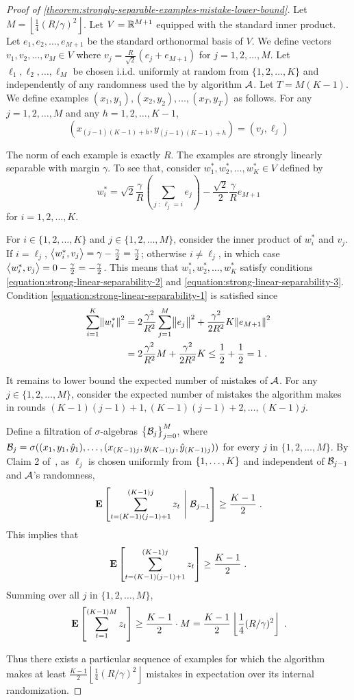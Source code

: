 \begin{proof}[Proof of \autoref{theorem:strongly-separable-examples-mistake-lower-bound}]
Let $M = \left\lfloor \frac{1}{4} (R/\gamma)^2
\right\rfloor$. Let $V = \mathbb{R}^{M+1}$ equipped with the standard inner product.
Let $e_1, e_2, \dots, e_{M+1}$ be the standard orthonormal basis of $V$. We
define vectors $v_1, v_2, \dots, v_M \in V$ where $v_j = \frac{R}{\sqrt{2}}(e_j
+ e_{M+1})$ for $j=1,2,\dots,M$. Let $\ell_1, \ell_2, \dots, \ell_M$ be chosen
i.i.d. uniformly at random from $\{1,2,\dots,K\}$ and independently of any
randomness used the by algorithm $\mathcal{A}$. Let $T = M (K - 1)$. We define examples $(x_1,
y_1), (x_2, y_2), \dots, (x_T, y_T)$ as follows. For any $j=1,2,\dots,M$ and any
$h=1,2,\dots,K-1$,
$$
(x_{(j-1)(K-1) + h}, y_{(j-1)(K-1) + h}) = (v_j, \ell_j)
$$

The norm of each example is exactly $R$. The examples are strongly linearly separable
with margin $\gamma$. To see that, consider $w_1^*, w_2^*, \dots, w_K^* \in V$
defined by
$$
w_i^* = \sqrt{2} \frac{\gamma}{R} \left( \sum_{j ~:~ \ell_j = i} e_j \right) - \frac{\sqrt{2}}2 \frac{\gamma}{R} e_{M+1}
$$
for $i=1,2,\dots,K$.

For $i \in \{1,2,\dots,K\}$ and $j \in
\{1,2,\dots,M\}$, consider the inner product of $w_i^*$ and $v_j$.
If $i = \ell_j$, $\left\langle w_i^*, v_j \right\rangle = \gamma - \frac \gamma 2 = \frac \gamma 2$;
otherwise $i \neq \ell_j$, in which case
$\left\langle w_i^*, v_j \right\rangle = 0 - \frac \gamma 2 = - \frac \gamma 2$.
This means that $w_1^*, w_2^*, \dots, w_K^*$ satisfy
conditions
\eqref{equation:strong-linear-separability-2} and
\eqref{equation:strong-linear-separability-3}. Condition \eqref{equation:strong-linear-separability-1}
is satisfied since
\begin{align*}
\sum_{i=1}^K \norm{w_i^*}^2
& = 2 \frac{\gamma^2}{R^2} \sum_{j=1}^M \norm{e_j}^2 +  \frac{\gamma^2}{2 R^2} K \norm{e_{M+1}}^2 \\
& = 2 \frac{\gamma^2}{R^2} M + \frac{\gamma^2}{2 R^2} K
\le \frac{1}{2} + \frac{1}{2}
= 1 \; .
\end{align*}

It remains to lower bound the expected number of mistakes of $\mathcal{A}$. For
any $j \in \{1,2,\dots,M\}$, consider the expected number of mistakes the
algorithm makes in rounds $(K-1)(j-1) + 1, (K-1)(j-1) + 2, \dots, (K-1)j$.

Define a filtration of $\sigma$-algebras $\cbr{\calB_j}_{j=0}^M$, where $\mathcal{B}_j
= \sigma((x_1, y_1, \hat{y}_1), \ldots, (x_{(K-1)j}, y_{(K-1)j},
\hat{y}_{(K-1)j}))$ for every $j$ in $\{1,2,\dots,M\}$. By Claim 2
of~\citet{Daniely-Helbertal-2013}, as $\ell_j$ is chosen uniformly from
$\cbr{1,\dots,K}$ and independent of $\mathcal{B}_{j-1}$ and $\mathcal{A}$'s randomness,
$$
\Exp \sbr{ \sum_{t=(K-1)(j-1) + 1}^{(K-1)j} z_t ~\Bigg|~ \calB_{j-1} } \ge \frac{K-1}{2} \; .
$$
This implies that
$$
\Exp \sbr{ \sum_{t=(K-1)(j-1) + 1}^{(K-1)j} z_t } \ge \frac{K-1}{2} \; .
$$
Summing over all $j$ in $\{1,2,\dots,M\}$,
$$
\Exp \sbr{ \sum_{t=1}^{(K-1)M} z_t} \geq \frac{K-1}2 \cdot M = \frac{K-1}2 \left\lfloor \frac 1 4 (R/\gamma)^2 \right\rfloor \; .
$$

Thus there exists a particular sequence of examples for which
the algorithm makes at least $\frac{K-1}2 \left\lfloor \frac 1 4 (R/\gamma)^2
\right\rfloor$ mistakes in expectation over its internal randomization.
\end{proof}
